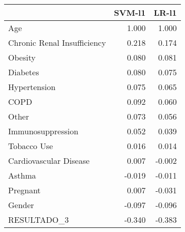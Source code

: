 \begin{tabular}{lrr}
\toprule
{} &  SVM-l1 &  LR-l1 \\
\midrule
Age                         &   1.000 &  1.000 \\
Chronic Renal Insufficiency &   0.218 &  0.174 \\
Obesity                     &   0.080 &  0.081 \\
Diabetes                    &   0.080 &  0.075 \\
Hypertension                &   0.075 &  0.065 \\
COPD                        &   0.092 &  0.060 \\
Other                       &   0.073 &  0.056 \\
Immunosuppression           &   0.052 &  0.039 \\
Tobacco Use                 &   0.016 &  0.014 \\
Cardiovascular Disease      &   0.007 & -0.002 \\
Asthma                      &  -0.019 & -0.011 \\
Pregnant                    &   0.007 & -0.031 \\
Gender                      &  -0.097 & -0.096 \\
RESULTADO\_3                 &  -0.340 & -0.383 \\
\bottomrule
\end{tabular}
